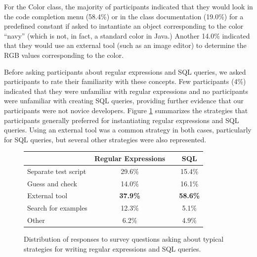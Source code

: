 \documentclass[10pt, conference, compsocconf]{IEEEtran}
\begin{document}
For the Color class, the majority of participants indicated that they would look in the code completion menu (58.4\%) or in the class documentation (19.0\%) for a predefined constant if asked to instantiate an object corresponding to the color ``navy'' (which is not, in fact, a standard color in Java.) Another 14.0\% indicated that they would use an external tool (such as an image editor) to determine the RGB values corresponding to the color. 
 
Before asking participants about regular expressions and SQL queries, we asked participants to rate their familiarity with these concepts. Few participants (4\%) indicated that they were unfamiliar with regular expressions and no participants were unfamiliar with creating SQL queries, providing further evidence that our participants were not novice developers. Figure \ref{strategies} summarizes the strategies that participants generally preferred for instantiating regular expressions and SQL queries. Using an external tool was a common strategy in both cases, particularly for SQL queries, but several other strategies were also represented.

\begin{figure}
\begin{tabular}{lccc}
 & Regular Expressions &  & SQL\\
 \hline
Separate test script & 29.6\% &  & 15.4\%\\
Guess and check & 14.0\% &  & 16.1\%\\
External tool & \textbf{37.9\%} &  & \textbf{58.6\%}\\
Search for examples & 12.3\% & & 5.1\% \\
Other & 6.2\% & & 4.9\% \\
\hline
\end{tabular}
\caption{Distribution of responses to survey questions asking about typical strategies for writing regular expressions and SQL queries.}
\label{strategies}
\end{figure}
\end{document}
